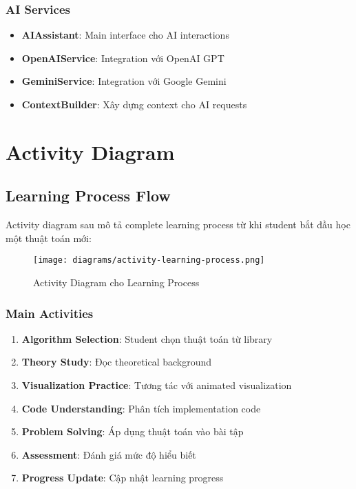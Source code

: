 \subsubsection{AI Services}

\begin{itemize}
    \item \textbf{AIAssistant}: Main interface cho AI interactions
    \item \textbf{OpenAIService}: Integration với OpenAI GPT
    \item \textbf{GeminiService}: Integration với Google Gemini
    \item \textbf{ContextBuilder}: Xây dựng context cho AI requests
\end{itemize}

\section{Activity Diagram}
\label{sec:activity-diagram}

\subsection{Learning Process Flow}
\label{subsec:learning-flow}

Activity diagram sau mô tả complete learning process từ khi student bắt đầu học một thuật toán mới:

\begin{figure}[H]
\centering
\texttt{[image: diagrams/activity-learning-process.png]}
\caption{Activity Diagram cho Learning Process}
\label{fig:activity-learning}
\end{figure}

\subsubsection{Main Activities}

\begin{enumerate}
    \item \textbf{Algorithm Selection}: Student chọn thuật toán từ library
    \item \textbf{Theory Study}: Đọc theoretical background
    \item \textbf{Visualization Practice}: Tương tác với animated visualization
    \item \textbf{Code Understanding}: Phân tích implementation code
    \item \textbf{Problem Solving}: Áp dụng thuật toán vào bài tập
    \item \textbf{Assessment}: Đánh giá mức độ hiểu biết
    \item \textbf{Progress Update}: Cập nhật learning progress
\end{enumerate}

